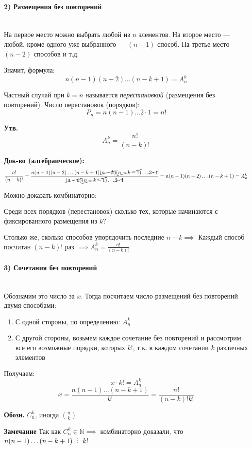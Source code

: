 \documentclass[10pt, a4paper]{article}
\def\divby{%
  \mathrel{\text{\vbox{\baselineskip.65ex\lineskiplimit0pt\hbox{.}\hbox{.}\hbox{.}}}}%
}
\begin{document}
\paragraph{2) Размещения без повторений}~\\[0.3em]
На первое место можно выбрать любой из $n$ элементов. На второе место --- любой, кроме одного уже выбранного --- $(n-1)$ способ. На третье место --- $(n-2)$ способов и т.д.

Значит, формула:
$$n(n-1)(n-2)\dots(n-k+1) = A_n^k$$

Частный случай при $k=n$ называется \textit{перестановкой} (размещения без повторений). 
Число перестановок (порядков):
$$P_n = n(n-1)\dots 2 \cdot 1 = n!$$

\textbf{Утв.} $$A_n^k = \frac{n!}{(n-k)!}$$

\textbf{Док-во (алгебраическое):}
$$\frac{n!}{(n-k)!} = \frac{n(n-1)(n-2)\dots(n-k+1)\cancel{(n-k)}\cancel{(n-k-1)}\dots \cancel{2\cdot 1}}{\cancel{(n-k)}\cancel{(n-k-1)}\dots \cancel{2\cdot 1}} = n(n-1)(n-2)\dots(n-k+1) = A_n^k$$

Можно доказать комбинаторно:

\vspace{0.2cm}
Среди всех порядков (перестановок) сколько тех, которые начинаются с фиксированного размещения из $k$?

Столько же, сколько способов упорядочить последние $n-k \implies$ Каждый способ посчитан $(n-k)!$ раз $\implies A_n^k = \frac{n!}{(n-k)!}$

\paragraph{3) Сочетания без повторений}~\\[0.3em]
Обозначим это число за $x$.
Тогда посчитаем число размещений без повторений двумя способами:
\begin{enumerate}
    \item С одной стороны, по определению: $A_n^k$
    \item С другой стороны, возьмем каждое сочетание без повторений и рассмотрим все его возможные порядки, которых $k!$, т.к. в каждом сочетании $k$ различных элементов
\end{enumerate}

Получаем: 
$$x \cdot k! = A_n^k$$
$$x = \frac{n(n-1)\dots(n-k+1)}{k!} = \frac{n!}{(n-k)!k!}$$

\textbf{Обозн.} $C_n^k$, иногда ${n \choose k}$

\textbf{Замечание} Так как $C_n^k \in \mathbb{N} \implies$ комбинаторно доказали, что $n(n-1)\dots(n-k+1) \ \divby \ k!$
\end{document}
